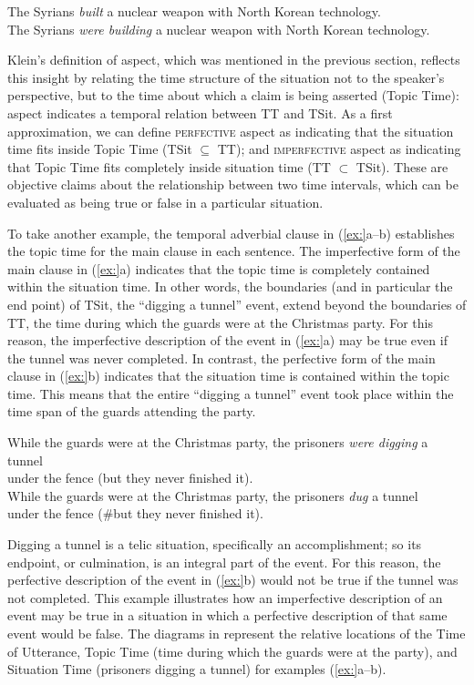 \ea
\ea The Syrians \textit{built} a nuclear weapon with North Korean technology.\\
\ex The Syrians \textit{were building} a nuclear weapon with North Korean technology.
                       \z
\z


Klein’s definition of aspect, which was mentioned in the previous section, reflects this insight by relating the time structure of the situation not to the speaker’s perspective, but to the time about which a claim is being asserted (Topic Time): aspect indicates a temporal relation between TT and TSit. As a first approximation, we can define \textsc{perfective} aspect as indicating that the situation time fits inside Topic Time (TSit ${\subseteq}$ TT); and \textsc{imperfective} aspect as indicating that Topic Time fits completely inside situation time (TT ${\subset}$ TSit). These are objective claims about the relationship between two time intervals, which can be evaluated as being true or false in a particular situation.



To take another example, the temporal adverbial clause in (\ref{ex:}a--b) establishes the topic time for the main clause in each sentence. The imperfective form of the main clause in (\ref{ex:}a) indicates that the topic time is completely contained within the situation time. In other words, the boundaries (and in particular the end point) of TSit, the “digging a tunnel” event, extend beyond the boundaries of TT, the time during which the guards were at the Christmas party. For this reason, the imperfective description of the event in (\ref{ex:}a) may be true even if the tunnel was never completed. In contrast, the perfective form of the main clause in (\ref{ex:}b) indicates that the situation time is contained within the topic time. This means that the entire “digging a tunnel” event took place within the time span of the guards attending the party.


\ea
\ea While the guards were at the Christmas party, the prisoners \textit{were digging} a tunnel \\
  under the fence (but they never finished it).\\
\ex While the guards were at the Christmas party, the prisoners \textit{dug} a tunnel \\
  under the fence (\#but they never finished it).
                       \z
\z


Digging a tunnel is a telic situation, specifically an accomplishment; so its endpoint, or culmination, is an integral part of the event. For this reason, the perfective description of the event in (\ref{ex:}b) would not be true if the tunnel was not completed. This example illustrates how an imperfective description of an event may be true in a situation in which a perfective description of that same event would be false. The diagrams in  represent the relative locations of the Time of Utterance, Topic Time (time during which the guards were at the party), and Situation Time (prisoners digging a tunnel) for examples (\ref{ex:}a--b).


